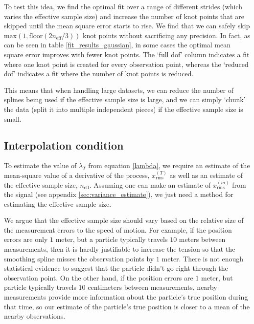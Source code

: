 \documentclass[10pt,journal]{IEEEtran}
\begin{document}
To test this idea, we find the optimal fit over a range of different strides (which varies the effective sample size) and increase the number of knot points that are skipped until the mean square error starts to rise. We find that we can safely skip $\textrm{max}(1,\textrm{floor}(2n_{\textrm{eff}}/3))$ knot points without sacrificing any precision. In fact, as can be seen in table \ref{fit_results_gaussian}, in some cases the optimal mean square error improves with fewer knot points. The `full dof' column indicates a fit where one knot point is created for every observation point, whereas the `reduced dof' indicates a fit where the number of knot points is reduced.

This means that when handling large datasets, we can reduce the number of splines being used if the effective sample size is large, and we can simply `chunk' the data (split it into multiple independent pieces) if the effective sample size is small.

\subsection{Interpolation condition} \label{interpolation_condition}

To estimate the value of $\lambda_T$ from equation \ref{lambda}, we require an estimate of the mean-square value of a derivative of the process, $x_{\textrm{rms}}^{(T)}$ as well as an estimate of the effective sample size, $n_{\textrm{eff}}$. Assuming one can make an estimate of $x_{\textrm{rms}}^{(m)}$ from the signal (see appendix \ref{sec:variance_estimate}), we just need a method for estimating the effective sample size.

We argue that the effective sample size should vary based on the relative size of the measurement errors to the speed of motion. For example, if the position errors are only $1$ meter, but a particle typically travels $10$ meters between measurements, then it is hardly justifiable to increase the tension so that the smoothing spline misses the observation points by $1$ meter. There is not enough statistical evidence to suggest that the particle didn't go right through the observation point. On the other hand, if the position errors are $1$ meter, but particle typically travels $10$ centimeters between measurements, nearby measurements provide more information about the particle's true position during that time, so our estimate of the particle's true position is closer to a mean of the nearby observations.
\end{document}
